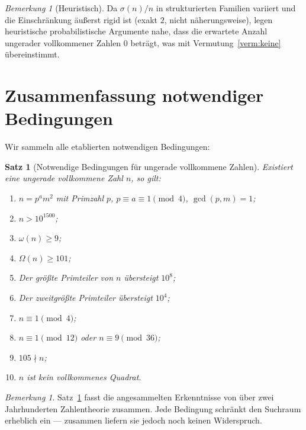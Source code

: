 \documentclass[12pt,a4paper]{amsart}
\newtheorem{satz}[theorem]{Satz}
\theoremstyle{definition}
\theoremstyle{remark}
\newtheorem{bemerkung}[theorem]{Bemerkung}
\begin{document}
\begin{bemerkung}[Heuristisch]
Da $\sigma(n)/n$ in strukturierten Familien variiert und die Einschränkung
äußerst rigid ist (exakt $2$, nicht näherungsweise), legen heuristische
probabilistische Argumente nahe, dass die erwartete Anzahl ungerader
vollkommener Zahlen $0$ beträgt, was mit Vermutung~\ref{verm:keine}
übereinstimmt.
\end{bemerkung}

\section{Zusammenfassung notwendiger Bedingungen}

Wir sammeln alle etablierten notwendigen Bedingungen:

\begin{satz}[Notwendige Bedingungen für ungerade vollkommene Zahlen]
\label{satz:nw}
Existiert eine ungerade vollkommene Zahl $n$, so gilt:
\begin{enumerate}[label=(\roman*)]
  \item $n = p^a m^2$ mit Primzahl $p$, $p \equiv a \equiv 1 \pmod{4}$,
        $\gcd(p,m)=1$;
  \item $n > 10^{1500}$;
  \item $\omega(n) \geq 9$;
  \item $\Omega(n) \geq 101$;
  \item Der größte Primteiler von $n$ übersteigt $10^8$;
  \item Der zweitgrößte Primteiler übersteigt $10^4$;
  \item $n \equiv 1 \pmod{4}$;
  \item $n \equiv 1 \pmod{12}$ oder $n \equiv 9 \pmod{36}$;
  \item $105 \nmid n$;
  \item $n$ ist kein vollkommenes Quadrat.
\end{enumerate}
\end{satz}

\begin{bemerkung}
Satz~\ref{satz:nw} fasst die angesammelten Erkenntnisse von über zwei
Jahrhunderten Zahlentheorie zusammen.
Jede Bedingung schränkt den Suchraum erheblich ein --- zusammen liefern sie
jedoch noch keinen Widerspruch.
\end{bemerkung}

\end{document}
